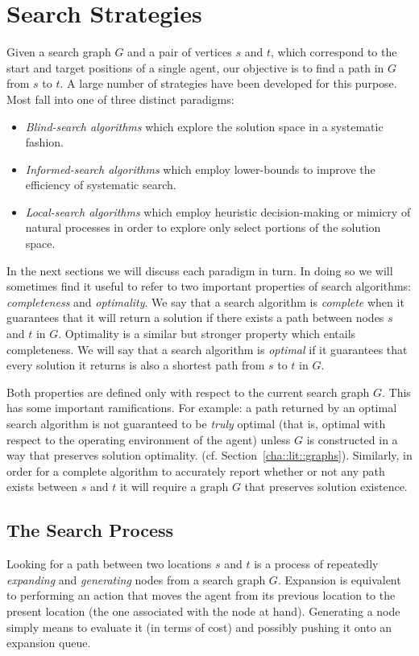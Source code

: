 \section{Search Strategies}
\label{cha::lit::search}
Given a search graph $G$ and a pair of vertices $s$ and $t$, which correspond to the 
start and target positions of a single agent, our objective is to find a path in $G$
from $s$ to $t$.
A large number of strategies have been developed for this purpose. Most fall into
one of three distinct paradigms:
\begin{itemize}
\item{\emph{Blind-search algorithms} which explore the solution space in a systematic fashion.}
\item{\emph{Informed-search algorithms} which employ lower-bounds to improve the 
efficiency of systematic search.}
\item{\emph{Local-search algorithms} which employ heuristic decision-making or mimicry of
natural processes in order to explore only select portions of the solution space.}
\end{itemize}

In the next sections we will discuss each paradigm in turn. In doing so we will sometimes
find it useful to refer to two important properties of search algorithms: \emph{completeness} 
and \emph{optimality}.
We say that a search algorithm is \emph{complete} when it guarantees that it will return a
solution if there exists a path between nodes $s$ and $t$ in $G$. 
Optimality is a similar but stronger property which entails completeness. 
We will say that a search algorithm is \emph{optimal} if it guarantees that every solution it 
returns is also a shortest path from $s$ to $t$ in $G$. 

Both properties are defined only with respect to the current search graph $G$.
This has some important ramifications. For example: a path returned by an optimal search algorithm
is not guaranteed to be \emph{truly} optimal (that is, optimal with respect to the operating environment 
of the agent) unless $G$ is constructed in a way that preserves solution optimality.
(cf. Section~\ref{cha::lit::graphs}).
Similarly, in order for a complete algorithm to accurately report whether or not any path exists between 
$s$ and $t$ it will require a graph $G$ that preserves solution existence.

\subsection{The Search Process}
\label{cha::lit::search:terms}
Looking for a path between two locations $s$ and $t$ is a process of repeatedly
\emph{expanding} and \emph{generating} nodes from a search graph $G$.  
Expansion is equivalent to
performing an action that moves the agent from its previous location to the 
present location (the one associated with the node at hand).
Generating a node simply means to evaluate it (in terms of cost) and possibly
pushing it onto an expansion queue.

